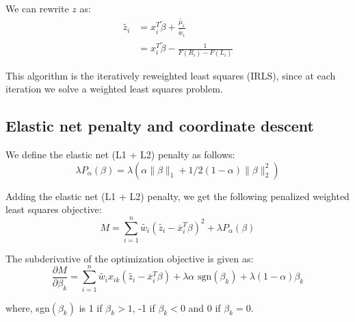 \documentclass[12pt,a4paper]{report}
\begin{document}
We can rewrite $z$ as:
\begin{equation} \label{z_i}
\begin{split}
\widetilde{ z_i} & = x_i^T \widetilde{ \beta} + \frac{ \widetilde{ \mu_i}} {\widetilde{ w_i}} \\
				 & = x_i^T \widetilde{ \beta} - \frac{ 1}{F(R_i) - F(L_i)}
\end{split}
\end{equation}

This algorithm is the iteratively reweighted least squares (IRLS), since at each iteration we solve a weighted least squares problem.

\subsection*{Elastic net penalty and coordinate descent}
We define the elastic net (L1 + L2) penalty as follows:
\begin{equation} \label{objective}
\lambda P_{\alpha}(\beta) = \lambda(\alpha \|\beta\|_1 + 1/2 (1-\alpha) \|\beta\|_2^2)
\end{equation}

Adding the elastic net (L1 + L2) penalty, we get the following penalized weighted least squares objective:
\begin{equation} \label{objective}
M = \sum_{i=1}^n \widetilde{w_i} (\widetilde{z_i} - \overline x_i^T \beta)^2
	 + \lambda P_{\alpha}(\beta)
\end{equation}

The subderivative of the optimization objective is given as:
\begin{equation}
\frac{ \partial M}{\partial \beta_k} = \sum_{i=1}^n \widetilde{w_i} x_{ik} (\widetilde{ z_i} - \overline x_i^T \beta ) + \lambda \alpha \mbox{ sgn}(\beta_k) + \lambda (1-\alpha)\beta_k
\end{equation}

where, sgn$(\beta_k)$ is 1 if $\beta_k > 1$, -1 if $\beta_k<0$ and 0 if $\beta_k = 0$.
\end{document}
